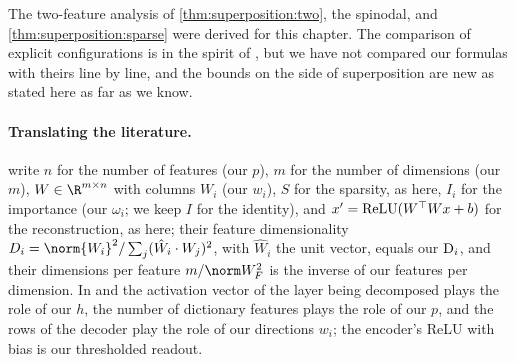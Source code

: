 \begin{refsection}
The two-feature analysis of \cref{thm:superposition:two}, the spinodal, and \cref{thm:superposition:sparse} were derived for this chapter. The comparison of explicit configurations is in the spirit of \textcite{ElhageEtAl2022}, but we have not compared our formulas with theirs line by line, and the bounds on the side of superposition are new as stated here as far as we know.

\paragraph{Translating the literature.} \Textcite{ElhageEtAl2022} write $n$ for the number of features (our $p$), $m$ for the number of dimensions (our $m$), $W\in\R^{m\times n}$ with columns $W_i$ (our $w_i$), $S$ for the sparsity, as here, $I_i$ for the importance (our $\omega_i$; we keep $I$ for the identity), and $x'=\operatorname{ReLU}(W^\top Wx+b)$ for the reconstruction, as here; their feature dimensionality $D_i=\norm{W_i}^2/\sum_j(\hat W_i\cdot W_j)^2$, with $\hat W_i$ the unit vector, equals our $\mathrm{D}_i$, and their dimensions per feature $m/\norm W_F^2$ is the inverse of our features per dimension. In \textcite{BrickenEtAl2023} and \textcite{TempletonEtAl2024} the activation vector of the layer being decomposed plays the role of our $h$, the number of dictionary features plays the role of our $p$, and the rows of the decoder play the role of our directions $w_i$; the encoder's ReLU with bias is our thresholded readout.

\printchapterbib
\end{refsection}
